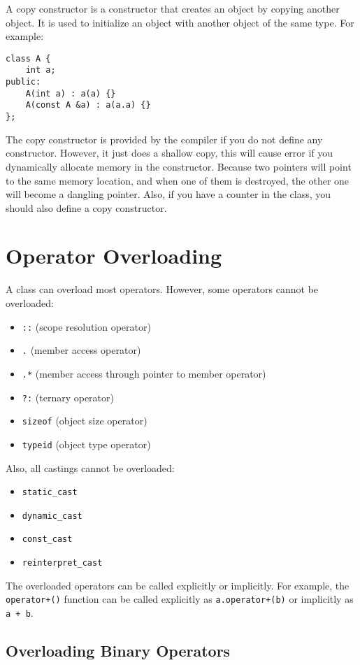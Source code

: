\documentclass[a4paper,12pt]{article}
\begin{document}
A copy constructor is a constructor that creates an object by copying another object.
It is used to initialize an object with another object of the same type.
For example:
\begin{verbatim}
class A {
    int a;
public:
    A(int a) : a(a) {}
    A(const A &a) : a(a.a) {}
};
\end{verbatim}

The copy constructor is provided by the compiler if you do not define any constructor.
However, it just does a shallow copy, this will cause error if you dynamically allocate memory in the constructor.
Because two pointers will point to the same memory location, and when one of them is destroyed, the other one will become a dangling pointer.
Also, if you have a counter in the class, you should also define a copy constructor.

\section{Operator Overloading}

A class can overload most operators.
However, some operators cannot be overloaded:
\begin{itemize}
	\item \texttt{::} (scope resolution operator)
	\item \texttt{.} (member access operator)
	\item \texttt{.*} (member access through pointer to member operator)
	\item \texttt{?:} (ternary operator)
	\item \texttt{sizeof} (object size operator)
	\item \texttt{typeid} (object type operator)
\end{itemize}

Also, all castings cannot be overloaded:
\begin{itemize}
	\item \texttt{static\_cast}
	\item \texttt{dynamic\_cast}
	\item \texttt{const\_cast}
	\item \texttt{reinterpret\_cast}
\end{itemize}

The overloaded operators can be called explicitly or implicitly.
For example, the \texttt{operator+()} function can be called explicitly as \texttt{a.operator+(b)} or implicitly as \texttt{a + b}.

\subsection{Overloading Binary Operators}
\end{document}
